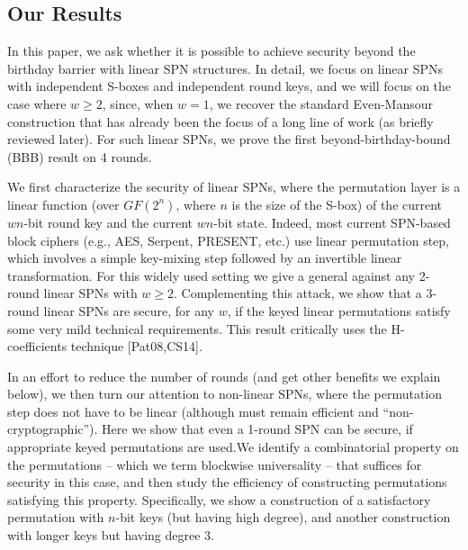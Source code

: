 \subsection{Our Results}


In this paper, we ask whether it is possible to achieve security beyond the birthday barrier with linear SPN structures. In detail, we focus on linear SPNs with independent S-boxes and independent round keys, and we will focus on the case where $w\geq2$, since, when $w = 1$, we recover the standard Even-Mansour construction that has already been the focus
of a long line of work (as briefly reviewed later). For such linear SPNs, we prove the first beyond-birthday-bound (BBB) result on 4 rounds.





We first characterize the security of linear SPNs, where the
permutation layer is a linear function (over $GF(2^n)$, where $n$ is the size of the S-box) of the current $wn$-bit round key and the current $wn$-bit state. Indeed, most current SPN-based block ciphers (e.g., AES, Serpent, PRESENT, etc.)
use linear permutation step, which involves a simple key-mixing step followed
by an invertible linear transformation. For this widely used setting we give a
general against any 2-round linear SPNs with $w\geq2$. Complementing this
attack, we show that a 3-round linear SPNs are secure, for any $w$, if the keyed linear permutations satisfy some very mild technical requirements. This result critically uses the H-coefficients technique [Pat08,CS14].


In an effort to reduce the number of rounds (and get other
benefits we explain below), we then turn our attention to non-linear SPNs, where
the permutation step does not have to be linear (although must remain efficient
and ``non-cryptographic''). Here we show that even a 1-round SPN can be secure,
if appropriate keyed permutations are used.We identify a combinatorial property
on the permutations -- which we term blockwise universality -- that suffices for
security in this case, and then study the efficiency of constructing permutations
satisfying this property. Specifically, we show a construction of a satisfactory
permutation with $n$-bit keys (but having high degree), and another construction
with longer keys but having degree 3.



